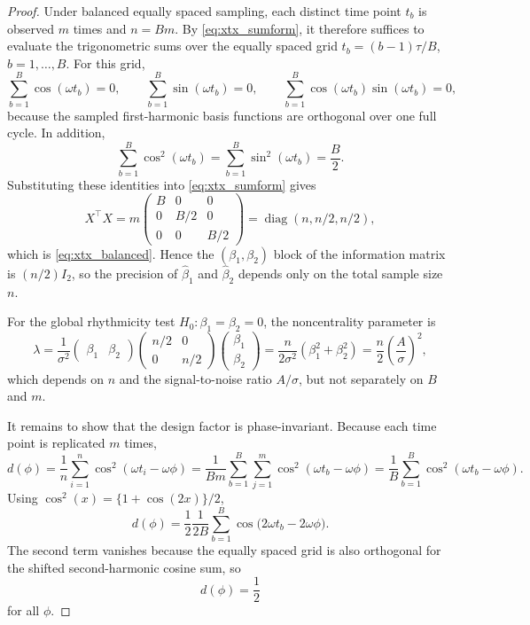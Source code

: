 \documentclass{article}
\begin{document}
\begin{proof}
Under balanced equally spaced sampling, each distinct time point $t_b$ is
observed $m$ times and $n=Bm$. By \eqref{eq:xtx_sumform}, it therefore
suffices to evaluate the trigonometric sums over the equally spaced grid
$t_b=(b-1)\tau/B$, $b=1,\ldots,B$. For this grid,
\[
\sum_{b=1}^B \cos(\omega t_b)=0,
\qquad
\sum_{b=1}^B \sin(\omega t_b)=0,
\qquad
\sum_{b=1}^B \cos(\omega t_b)\sin(\omega t_b)=0,
\]
because the sampled first-harmonic basis functions are orthogonal over one full
cycle. In addition,
\[
\sum_{b=1}^B \cos^2(\omega t_b)
=
\sum_{b=1}^B \sin^2(\omega t_b)
=
\frac{B}{2}.
\]
Substituting these identities into \eqref{eq:xtx_sumform} gives
\[
X^\top X
=
m
\begin{pmatrix}
B & 0 & 0 \\
0 & B/2 & 0 \\
0 & 0 & B/2
\end{pmatrix}
=
\operatorname{diag}(n,n/2,n/2),
\]
which is \eqref{eq:xtx_balanced}. Hence the $(\beta_1,\beta_2)$ block of the
information matrix is $(n/2)I_2$, so the precision of $\hat\beta_1$ and
$\hat\beta_2$ depends only on the total sample size $n$.

For the global rhythmicity test $H_0:\beta_1=\beta_2=0$, the noncentrality
parameter is
\[
\lambda
=
\frac{1}{\sigma^2}
\begin{pmatrix}\beta_1 & \beta_2\end{pmatrix}
\begin{pmatrix} n/2 & 0 \\ 0 & n/2 \end{pmatrix}
\begin{pmatrix}\beta_1 \\ \beta_2\end{pmatrix}
=
\frac{n}{2\sigma^2}(\beta_1^2+\beta_2^2)
=
\frac{n}{2}\left(\frac{A}{\sigma}\right)^2,
\]
which depends on $n$ and the signal-to-noise ratio $A/\sigma$, but not
separately on $B$ and $m$.

It remains to show that the design factor is phase-invariant. Because each
time point is replicated $m$ times,
\[
d(\phi)
=
\frac{1}{n}\sum_{i=1}^n \cos^2(\omega t_i-\omega\phi)
=
\frac{1}{Bm}\sum_{b=1}^B \sum_{j=1}^m \cos^2(\omega t_b-\omega\phi)
=
\frac{1}{B}\sum_{b=1}^B \cos^2(\omega t_b-\omega\phi).
\]
Using $\cos^2(x)=\{1+\cos(2x)\}/2$,
\[
d(\phi)
=
\frac{1}{2}
\frac{1}{2B}\sum_{b=1}^B \cos\!\bigl(2\omega t_b-2\omega\phi\bigr).
\]
The second term vanishes because the equally spaced grid is also orthogonal for
the shifted second-harmonic cosine sum, so
\[
d(\phi)=\frac{1}{2}
\]
for all $\phi$.
\end{proof}
\end{document}
